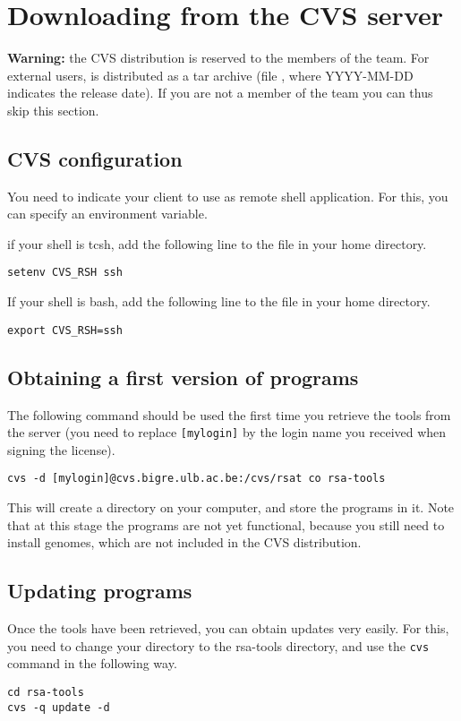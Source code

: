 \section{Downloading \RSAT from the CVS server}

\textbf{Warning:} the CVS distribution is reserved to the members of
the \RSAT team. For external users, \RSAT is distributed as a tar
archive (file , where YYYY-MM-DD
indicates the release date). If you are not a member of the \RSAT team
you can thus skip this section.

\subsection{CVS configuration}

You need to indicate your  client to use 
as remote shell application. For this, you can specify an environment
variable.

if your shell is tcsh, add the following line to the 
file in your home directory.

\begin{lstlisting}
setenv CVS_RSH ssh
\end{lstlisting}


If your shell is bash, add the following line to the 
file in your home directory.

\begin{lstlisting}
export CVS_RSH=ssh
\end{lstlisting}

\subsection{Obtaining a first version of \RSAT programs}

The following command should be used the first time you retrieve the
tools from the server (you need to replace \texttt{[mylogin]} by the
login name you received when signing the \RSAT license).

\begin{lstlisting}
cvs -d [mylogin]@cvs.bigre.ulb.ac.be:/cvs/rsat co rsa-tools
\end{lstlisting}


This will create a directory  on your computer, and
store the programs in it. Note that at this stage the programs are not
yet functional, because you still need to install genomes, which are
not included in the CVS distribution.

\subsection{Updating \RSAT programs}

Once the tools have been retrieved, you can obtain updates very
easily. For this, you need to change your directory to the rsa-tools
directory, and use the \texttt{cvs} command in the following way.

\begin{lstlisting}
cd rsa-tools
cvs -q update -d
\end{lstlisting}


